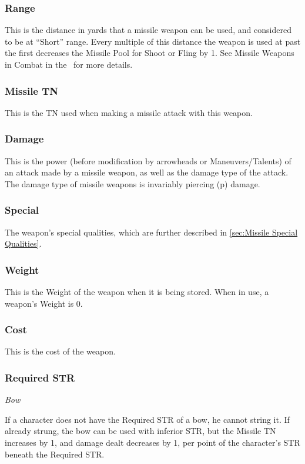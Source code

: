 \documentclass[oneside,11pt,english]{book}
\begin{document}
\subsubsection{Range}
This is the distance in yards that a missile weapon can be used, and considered to be at “Short” range. 
Every multiple of this distance the weapon is used at past the first decreases the Missile Pool for Shoot or 
Fling by 1. See Missile Weapons in Combat in the ~for more details.  %

\subsubsection{Missile TN}
This is the TN used when making a missile attack with this weapon.

\subsubsection{Damage}
This is the power (before modification by arrowheads or Maneuvers/Talents) of an attack made by a 
missile weapon, as well as the damage type of the attack. The damage type of missile weapons is 
invariably piercing (p) damage. 


\subsubsection{Special}
The weapon’s special qualities, which are further described in \autoref{sec:Missile Special Qualities}.

\subsubsection{Weight}
This is the Weight of the weapon when it is being stored. When in use, a weapon’s Weight is 0. 

\subsubsection{Cost}
This is the cost of the weapon.

\subsubsection{Required STR}
\vspace{-10pt}\emph{Bow}

If a character does not have the Required STR of a bow, he cannot string it. If already strung, the bow can 
be used with inferior STR, but the Missile TN increases by 1, and damage dealt decreases by 1, per point 
of the character’s STR beneath the Required STR. 
\end{document}
